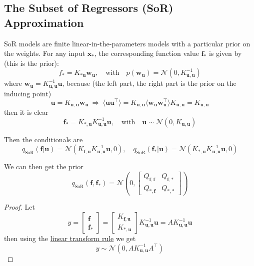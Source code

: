 \documentclass[10pt]{elegantbook}
\begin{document}
\subsection{The Subset of Regressors (SoR) Approximation}
SoR models are finite linear-in-the-parameters models with a particular prior on the weights.
For any input $\mathbf x_*$, the corresponding function value $\mathbf f_*$ is
given by (this is the prior):
\begin{equation}
    f_{*}=K_{*\mathbf{u}}\mathbf{w}_{\mathbf{u}},\quad
    \mathrm{with} \quad p(\mathbf{w}_{\mathbf{u}})=\mathcal{N}(0,K_{\mathbf{u},\mathbf{u}}^{-1})
\end{equation}
where $\mathbf w_{\mathbf u} = K_{\mathbf u, \mathbf u}^{-1} \mathbf u$, because (the left part, the right part is the prior on the inducing point)
\begin{equation}
    \mathbf{u}=K_{\mathbf{u,u}}\mathbf{w}_{\mathbf{u}}\ \Rightarrow\ 
    \langle\mathbf{u}\mathbf{u}^{\top}\rangle=K_{\mathbf{u,u}}\langle\mathbf{w}_{\mathbf{u}}\mathbf{w}_{\mathbf{u}}^{\top}\rangle K_{\mathbf{u,u}}=K_{\mathbf{u,u}}
\end{equation}
then it is clear
\begin{equation}
    \mathbf{f}_{*}
    =K_{*,\mathbf{u}}K_{\mathbf{u},\mathbf{u}}^{-1}\mathbf{u},\quad\mathrm{with}\quad\mathbf{u}\sim{\mathcal{N}}(0,K_{\mathbf{u},\mathbf{u}})
\end{equation}

Then the conditionals are
\begin{equation}
    q_{\text{SoR}}(\mathbf{f|u})=
    \mathcal{N}(K_{\mathbf{f,u}}K_{\mathbf{u,u}}^{-1}\mathbf{u},0),
    \quad q_{\text{SoR}}(\mathbf{f_{*}}|\mathbf{u})
    =\mathcal{N}(K_{*, \mathbf u}K_{\mathbf{u,u}}^{-1}\mathbf{u},0)
\end{equation}

We can then get the prior
\begin{equation}
    q_{\text{SoR}}(\mathbf f, \mathbf f_*) = \mathcal N \left ( 0, \begin{bmatrix}
        Q_{\mathbf f, \mathbf f} & Q_{\mathbf f, *} \\
        Q_{*, \mathbf f} & Q_{*, *}
    \end{bmatrix} \right )
\end{equation}

\begin{proof}
    Let
    \[
    y = 
    \begin{bmatrix}
        \mathbf f \\
        \mathbf f_*
    \end{bmatrix} = 
    \begin{bmatrix}
        K_{\mathbf{f,u}} \\
        K_{*, \mathbf u}
    \end{bmatrix} K_{\mathbf{u,u}}^{-1} \mathbf{u} = 
    A K_{\mathbf{u,u}}^{-1} \mathbf{u}
    \]
    then using the \href{https://statproofbook.github.io/P/mvn-ltt}{linear transform rule} we get
    \[ y \sim \mathcal N (0, A K_{\mathbf{u,u}}^{-1} A^{\top}) \]
\end{proof}
\end{document}
